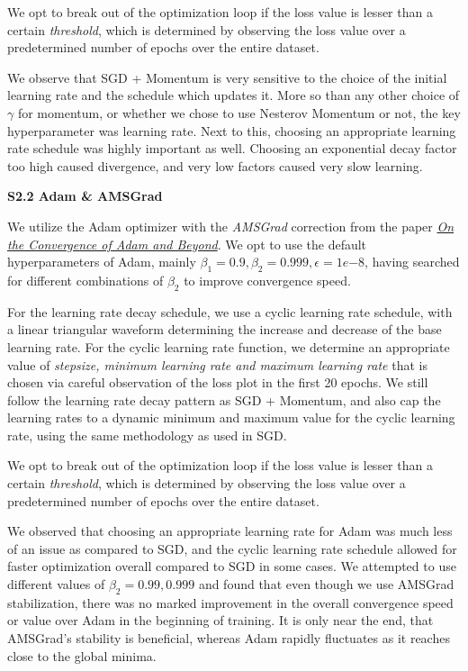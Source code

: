 \documentclass[11pt]{report}
\begin{document}
We opt to break out of the optimization loop if the loss value is lesser than a certain \textit{threshold}, which is determined by observing the loss value over a predetermined number of epochs over the entire dataset.

We observe that SGD + Momentum is very sensitive to the choice of the initial learning rate and the schedule which updates it. More so than any other choice of $\gamma$ for momentum, or whether we chose to use Nesterov Momentum or not, the key hyperparameter was learning rate. Next to this, choosing an appropriate learning rate schedule was highly important as well. Choosing an exponential decay factor too high caused divergence, and very low factors caused very slow learning.

{\bf S2.2 Adam \& AMSGrad}

We utilize the Adam optimizer with the \textit{AMSGrad} correction from the paper \href{https://openreview.net/forum?id=ryQu7f-RZ}{\textit{On the Convergence of Adam and Beyond}}. We opt to use the default hyperparameters of Adam, mainly $\beta_1 = 0.9, \beta_2 = 0.999, \epsilon = 1e{-8}$, having searched for different combinations of $\beta_2$ to improve convergence speed.

For the learning rate decay schedule, we use a cyclic learning rate schedule, with a linear triangular waveform determining the increase and decrease of the base learning rate. For the cyclic learning rate function, we determine an appropriate value of \textit{stepsize, minimum learning rate and maximum learning rate} that is chosen via careful observation of the loss plot in the first 20 epochs. We still follow the learning rate decay pattern as SGD + Momentum, and also cap the learning rates to a dynamic minimum and maximum value for the cyclic learning rate, using the same methodology as used in SGD.

We opt to break out of the optimization loop if the loss value is lesser than a certain \textit{threshold}, which is determined by observing the loss value over a predetermined number of epochs over the entire dataset.

We observed that choosing an appropriate learning rate for Adam was much less of an issue as compared to SGD, and the cyclic learning rate schedule allowed for faster optimization overall compared to SGD in some cases. We attempted to use different values of $\beta_2 = {0.99, 0.999}$ and found that even though we use AMSGrad stabilization, there was no marked improvement in the overall convergence speed or value over Adam in the beginning of training. It is only near the end, that AMSGrad's stability is beneficial, whereas Adam rapidly fluctuates as it reaches close to the global minima.
\end{document}
